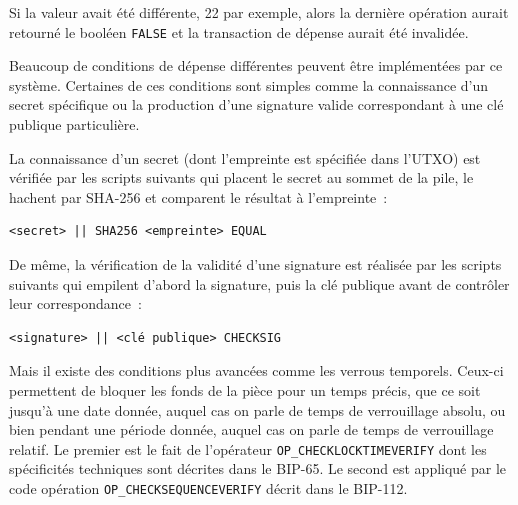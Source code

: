 Si la valeur avait été différente, 22 par exemple, alors la dernière opération aurait retourné le booléen \texttt{FALSE} et la transaction de dépense aurait été invalidée.


Beaucoup de conditions de dépense différentes peuvent être implémentées par ce système. Certaines de ces conditions sont simples comme la connaissance d'un secret spécifique ou la production d'une signature valide correspondant à une clé publique particulière.

La connaissance d'un secret (dont l'empreinte est spécifiée dans l'UTXO) est vérifiée par les scripts suivants qui placent le secret au sommet de la pile, le hachent par SHA-256 et comparent le résultat à l'empreinte~:

\begin{Verbatim}[fontsize=\footnotesize]
<secret> || SHA256 <empreinte> EQUAL
\end{Verbatim}

De même, la vérification de la validité d'une signature est réalisée par les scripts suivants qui empilent d'abord la signature, puis la clé publique avant de contrôler leur correspondance~:

\begin{Verbatim}[fontsize=\footnotesize]
<signature> || <clé publique> CHECKSIG
\end{Verbatim}

Mais il existe des conditions plus avancées comme les verrous temporels. Ceux-ci permettent de bloquer les fonds de la pièce pour un temps précis, que ce soit jusqu'à une date donnée, auquel cas on parle de temps de verrouillage absolu, ou bien pendant une période donnée, auquel cas on parle de temps de verrouillage relatif. Le premier est le fait de l'opérateur \texttt{OP\_CHECKLOCKTIMEVERIFY} dont les spécificités techniques sont décrites dans le BIP-65. Le second est appliqué par le code opération \texttt{OP\_CHECKSEQUENCEVERIFY} décrit dans le BIP-112.

